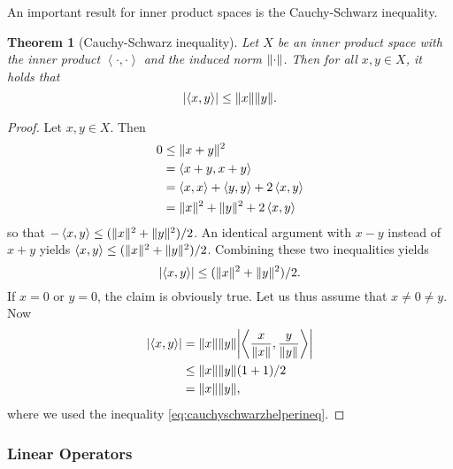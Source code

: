 \documentclass[english, 12pt, a4paper, sci, utf8, a-2b, online]{aaltothesis}
\theoremstyle{definition}
\theoremstyle{plain}
\newtheorem{theorem}{Theorem}[section]
\DeclarePairedDelimiter\abs{\lvert}{\rvert}
\DeclarePairedDelimiter\norm{\lVert}{\rVert}
\newcommand*{\innerprod}[2]{\left\langle #1, #2 \right\rangle}
\numberwithin{equation}{section}
\begin{document}
An important result for inner product spaces is the Cauchy-Schwarz inequality.
\begin{theorem}[Cauchy-Schwarz inequality]
    \label{thm:cauchyschwarz}
    Let $X$ be an inner product space with the inner product
    $\innerprod{\cdot}{\cdot}$ and the induced norm $\norm{\cdot}$.
    Then for all $x,y \in X$, it holds that
    \begin{equation*}
        \abs{\innerprod{x}{y}} \leq \norm{x} \norm{y}.
    \end{equation*}
\end{theorem}
\begin{proof}
    Let $x,y \in X$. Then
    \begin{align*}
        0 
        &\leq \norm{x + y}^2 \\
        &= \innerprod{x + y}{x + y} \\
        &= \innerprod{x}{x} + \innerprod{y}{y} + 2\innerprod{x}{y} \\
        &= \norm{x}^2 + \norm{y}^2 + 2\innerprod{x}{y}
    \end{align*}
    so that $-\innerprod{x}{y} \leq (\norm{x}^2 + \norm{y}^2)/2$.
    An identical argument with $x-y$ instead of $x+y$ yields
    $\innerprod{x}{y} \leq (\norm{x}^2 + \norm{y}^2)/2$.
    Combining these two inequalities yields
    \begin{equation}
        \label{eq:cauchyschwarzhelperineq}
        \abs{\innerprod{x}{y}} \leq (\norm{x}^2 + \norm{y}^2)/2.
    \end{equation}
    If $x=0$ or $y=0$, the claim is obviously true.
    Let us thus assume that $x \neq 0 \neq y$. Now
    \begin{align*}
        \abs{\innerprod{x}{y}}
        &= \norm{x} \norm{y} 
           \abs*{\innerprod{\frac{x}{\norm{x}}}{\frac{y}{\norm{y}}}} \\
        &\leq \norm{x} \norm{y} (1+1)/2 \\
        &= \norm{x} \norm{y},
    \end{align*}
    where we used the inequality \eqref{eq:cauchyschwarzhelperineq}.
\end{proof}

\subsubsection{Linear Operators}
\label{subsubsec:linearoperators}
\end{document}
